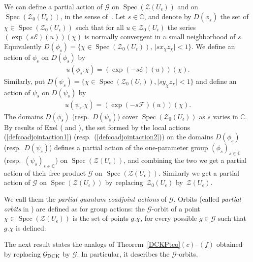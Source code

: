 \documentclass[pdftex]{sigma}%
\numberwithin{equation}{section}
\numberwithin{figure}{section}
\newcommand{\e}{\epsilon}
\newcommand{\Gg}{{\mathcal G}}
\begin{document}
We can define a partial action of ${\mathcal G}$ on $\operatorname{Spec}(\mathcal{Z}(U_\e))$ and on $\operatorname{Spec}(\mathcal{Z}_0(U_\e))$, in the sense of~\cite{Ex1}. Let $s\in {\mathbb C}$, and denote by $D(\phi_s)$ the set of $\chi\in \operatorname{Spec}(\mathcal{Z}_0(U_\epsilon))$ such that for all $u\in \mathcal{Z}_0(U_\epsilon)$ the series $(\exp(s{\mathcal E})(u))(\chi)$ is normally convergent in a small neighborhood of $s$. Equivalently $D(\phi_s)=\{\chi\in \operatorname{Spec}(\mathcal{Z}_0(U_\epsilon)), \,\vert s x_\chi z_\chi\vert <1\}$. We define an action of $\phi_s$ on $D(\phi_s)$ by
\begin{gather}\label{defcoadjointaction1}
u(\phi_s.\chi) = (\exp(-s{\mathcal E})(u))(\chi).
\end{gather}
Similarly, put $D(\psi_s)=\{\chi\in \operatorname{Spec}(\mathcal{Z}_0(U_\epsilon)), \vert s y_\chi z_\chi\vert <1\}$ and define an action of $\psi_s$ on $D(\psi_s)$ by
\begin{gather}\label{defcoadjointaction2}
u(\psi_s.\chi) = (\exp(-s{\mathcal F})(u))(\chi).
\end{gather}
The domains $D(\phi_s)$ (resp.~$D(\psi_s)$) cover $\operatorname{Spec}(\mathcal{Z}_0(U_\epsilon))$ as $s$ varies in ${\mathbb C}$. By results of Exel (\cite{Ex1} and \cite[Examples~1 and~4]{Ex2}), the set formed by the local actions (\ref{defcoadjointaction1}) (resp.~(\ref{defcoadjointaction2})) on the domains $D(\phi_s)$ (resp.~$D(\psi_s)$) defines a partial action of the one-parameter group $(\phi_s)_{s\in \mathbb C}$ (resp.~$(\psi_s)_{s\in \mathbb C}$) on $ \operatorname{Spec}(\mathcal{Z}(U_\epsilon))$, and combining the two we get a partial action of their free product ${\mathcal G}$ on $ \operatorname{Spec}(\mathcal{Z}(U_\epsilon))$. Similarly we get a partial action of ${\mathcal G}$ on $ \operatorname{Spec}(\mathcal{Z}(U_\epsilon))$ by~repla\-cing~$\mathcal{Z}_0(U_\epsilon)$ by~$\mathcal{Z}(U_\epsilon)$.

We call them the {\it partial quantum coadjoint actions} of $\mathcal{G}$. Orbits (called {\it partial orbits} in \cite{Ex1}) are defined as for group actions: the $\Gg$-orbit of a point $\chi \in\operatorname{Spec}(\mathcal{Z}(U_\epsilon))$ is the set of points $g.\chi$, for every possible $g\in \mathcal{G}$ such that $g.\chi$ is defined.


The next result states the analogs of Theorem~\ref{DCKPteo}$(c)$--$(f)$ obtained by replacing $\mathcal{G}_{\rm DCK}$ by $\mathcal{G}$. In particular, it describes the $\mathcal{G}$-orbits.
\end{document}
